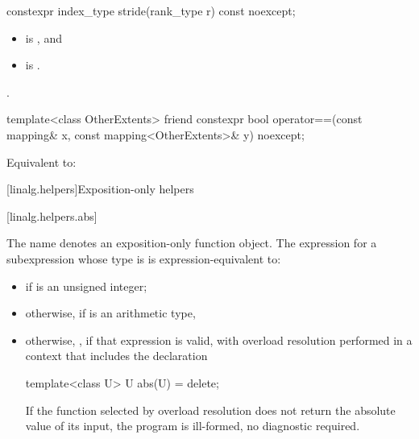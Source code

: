 %
\begin{itemdecl}
constexpr index_type stride(rank_type r) const noexcept;
\end{itemdecl}

\begin{itemdescr}
\pnum
\expects
\begin{itemize}
\item
{} is , and
\item
{} is .
\end{itemize}

\pnum
\returns
{}.
\end{itemdescr}

%
\begin{itemdecl}
template<class OtherExtents>
  friend constexpr bool operator==(const mapping& x, const mapping<OtherExtents>& y) noexcept;
\end{itemdecl}

\begin{itemdescr}
\pnum
\effects
Equivalent to: 
\end{itemdescr}

[linalg.helpers]{Exposition-only helpers}

[linalg.helpers.abs]{}

\pnum
The name  denotes an exposition-only function object.
The expression  for a subexpression 
whose type is  is expression-equivalent to:
\begin{itemize}
\item
{} if  is an unsigned integer;
\item
otherwise,  if  is an arithmetic type,
\item
otherwise, ,
if that expression is valid,
with overload resolution performed in a context that includes the declaration
\begin{codeblock}
template<class U> U abs(U) = delete;
\end{codeblock}
If the function selected by overload resolution
does not return the absolute value of its input,
the program is ill-formed, no diagnostic required.
\end{itemize}

